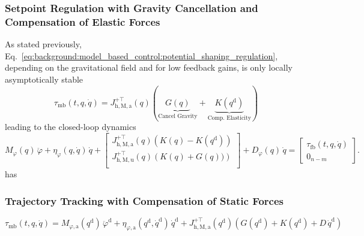 \subsubsection{Setpoint Regulation with Gravity Cancellation and Compensation of Elastic Forces}
As stated previously, Eq.~\ref{eq:background:model_based_control:potential_shaping_regulation}, depending on the gravitational field and for low feedback gains, is only locally asymptotically stable 
\begin{equation}
    \tau_\mathrm{mb}(t, q, \dot{q}) = J_{\mathrm{h},\mathrm{M},\mathrm{a}}^{+\top}(q) \left ( \underbrace{G(q)}_\text{Cancel Gravity} + \underbrace{K(q^\mathrm{d})}_\text{Comp. Elasticity} \right )
\end{equation}
leading to the closed-loop dynamics
\begin{equation}
    M_\varphi(q) \, \ddot{\varphi} + \eta_\varphi(q,\dot{q}) \, \dot{q} + \begin{bmatrix}
        J_{\mathrm{h},\mathrm{M},\mathrm{a}}^{+\top}(q) \left ( K(q) - K(q^\mathrm{d}) \right )\\
        J_{\mathrm{h},\mathrm{M},\mathrm{u}}^{+\top}(q) \left ( K(q) + G(q)) \right )\\
    \end{bmatrix} + D_\varphi(q) \, \dot{q} = \begin{bmatrix}
        \tau_\mathrm{fb}(t, q, \dot{q})\\ 0_{n-m}
    \end{bmatrix}.
\end{equation}
\citet{pustina2022feedback} has 

\subsubsection{Trajectory Tracking with Compensation of Static Forces}
\begin{equation}
    \tau_\mathrm{mb}(t, q, \dot{q}) = M_{\varphi,\mathrm{a}}(q^\mathrm{d}) \, \ddot{\varphi}^\mathrm{d} + \eta_{\varphi,\mathrm{a}}(q^\mathrm{d},\dot{q}^\mathrm{d}) \, \dot{q}^\mathrm{d} + J_{\mathrm{h},\mathrm{M},\mathrm{a}}^{+\top}(q^\mathrm{d}) \left ( G(q^\mathrm{d}) + K(q^\mathrm{d}) + D \, \dot{q}^\mathrm{d} \right )
\end{equation}


